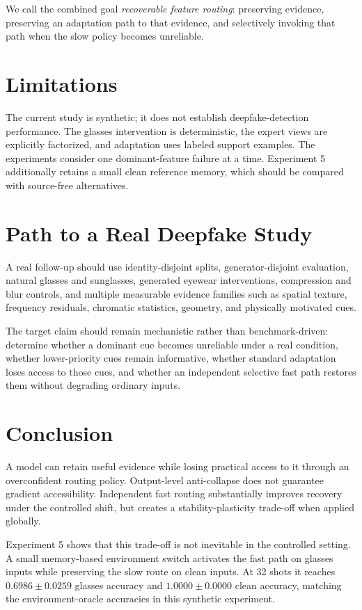 \documentclass[10pt]{article}
\begin{document}
We call the combined goal \emph{recoverable feature routing}: preserving evidence, preserving an adaptation path to that evidence, and selectively invoking that path when the slow policy becomes unreliable.

\section{Limitations}

The current study is synthetic; it does not establish deepfake-detection performance. The glasses intervention is deterministic, the expert views are explicitly factorized, and adaptation uses labeled support examples. The experiments consider one dominant-feature failure at a time. Experiment 5 additionally retains a small clean reference memory, which should be compared with source-free alternatives.

\section{Path to a Real Deepfake Study}

A real follow-up should use identity-disjoint splits, generator-disjoint evaluation, natural glasses and sunglasses, generated eyewear interventions, compression and blur controls, and multiple measurable evidence families such as spatial texture, frequency residuals, chromatic statistics, geometry, and physically motivated cues.

The target claim should remain mechanistic rather than benchmark-driven: determine whether a dominant cue becomes unreliable under a real condition, whether lower-priority cues remain informative, whether standard adaptation loses access to those cues, and whether an independent selective fast path restores them without degrading ordinary inputs.

\section{Conclusion}

A model can retain useful evidence while losing practical access to it through an overconfident routing policy. Output-level anti-collapse does not guarantee gradient accessibility. Independent fast routing substantially improves recovery under the controlled shift, but creates a stability-plasticity trade-off when applied globally.

Experiment 5 shows that this trade-off is not inevitable in the controlled setting. A small memory-based environment switch activates the fast path on glasses inputs while preserving the slow route on clean inputs. At 32 shots it reaches $0.6986 \pm 0.0259$ glasses accuracy and $1.0000 \pm 0.0000$ clean accuracy, matching the environment-oracle accuracies in this synthetic experiment.
\end{document}
